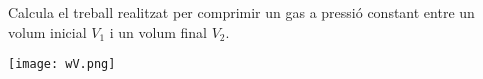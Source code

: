 \begin{exr}{}
    Calcula el treball realitzat per comprimir un gas a pressió constant entre un volum inicial $V_1$ i un volum final $V_2$.
    \begin{center}
    \texttt{[image: wV.png]}
    \end{center}
    \end{exr}
    \lct{}
